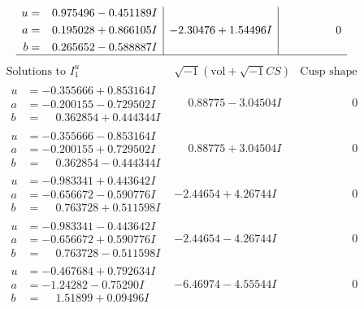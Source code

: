 \documentclass[1p]{elsarticle_modified}
\theoremstyle{definition}
\newcommand{\I}{\sqrt{-1}}
\begin{document}
$$\begin{array}{c|c|c}
\begin{aligned}
u &= \phantom{-}0.975496 - 0.451189 I \\
a &= \phantom{-}0.195028 + 0.866105 I \\
b &= \phantom{-}0.265652 - 0.588887 I\end{aligned}
 & -2.30476 + 1.54496 I & \phantom{-0.000000 } 0\\
 \hline 
 \end{array}$$\newpage$$\begin{array}{c|c|c}  
\text{Solutions to }I^u_{1}& \I (\text{vol} + \sqrt{-1}CS) & \text{Cusp shape}\\
 \hline 
\begin{aligned}
u &= -0.355666 + 0.853164 I \\
a &= -0.200155 - 0.729502 I \\
b &= \phantom{-}0.362854 + 0.444344 I\end{aligned}
 & \phantom{-}0.88775 - 3.04504 I & \phantom{-0.000000 } 0 \\ \hline\begin{aligned}
u &= -0.355666 - 0.853164 I \\
a &= -0.200155 + 0.729502 I \\
b &= \phantom{-}0.362854 - 0.444344 I\end{aligned}
 & \phantom{-}0.88775 + 3.04504 I & \phantom{-0.000000 } 0 \\ \hline\begin{aligned}
u &= -0.983341 + 0.443642 I \\
a &= -0.656672 - 0.590776 I \\
b &= \phantom{-}0.763728 + 0.511598 I\end{aligned}
 & -2.44654 + 4.26744 I & \phantom{-0.000000 } 0 \\ \hline\begin{aligned}
u &= -0.983341 - 0.443642 I \\
a &= -0.656672 + 0.590776 I \\
b &= \phantom{-}0.763728 - 0.511598 I\end{aligned}
 & -2.44654 - 4.26744 I & \phantom{-0.000000 } 0 \\ \hline\begin{aligned}
u &= -0.467684 + 0.792634 I \\
a &= -1.24282 - 0.75290 I \\
b &= \phantom{-}1.51899 + 0.09496 I\end{aligned}
 & -6.46974 - 4.55544 I & \phantom{-0.000000 } 0 \\ \hline\begin{aligned}

\end{aligned}
\end{array}$$
\end{document}
